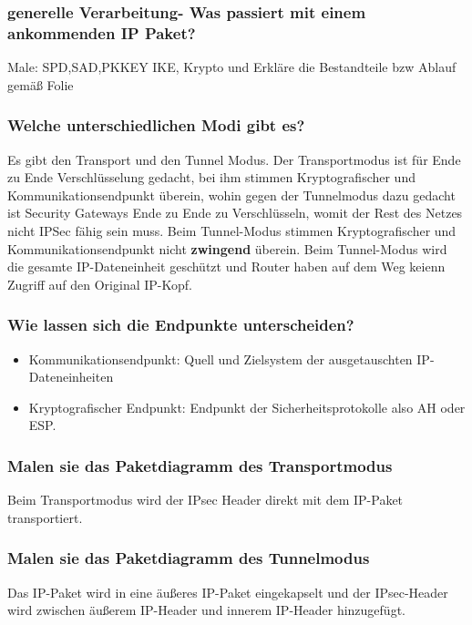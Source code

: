 	\subsubsection{generelle Verarbeitung- Was passiert mit einem ankommenden IP Paket?}
	Male: SPD,SAD,PK\textunderscore KEY IKE, Krypto und Erkläre die Bestandteile bzw Ablauf gemäß Folie %
	
	\subsubsection{Welche unterschiedlichen Modi gibt es?}
	Es gibt den Transport und den Tunnel Modus.
	Der Transportmodus ist für Ende zu Ende Verschlüsselung gedacht, bei ihm stimmen Kryptografischer und Kommunikationsendpunkt überein, wohin gegen der Tunnelmodus dazu gedacht ist Security Gateways Ende zu Ende zu Verschlüsseln, womit der Rest des Netzes nicht IPSec fähig sein muss. Beim Tunnel-Modus stimmen Kryptografischer und Kommunikationsendpunkt nicht \textbf{zwingend} überein. Beim Tunnel-Modus wird die gesamte IP-Dateneinheit geschützt und Router haben auf dem Weg keienn Zugriff auf den Original IP-Kopf.
	
	\subsubsection{Wie lassen sich die Endpunkte unterscheiden?}
	\begin{itemize}
		\item Kommunikationsendpunkt: Quell und Zielsystem der ausgetauschten IP-Dateneinheiten
		\item Kryptografischer Endpunkt: Endpunkt der Sicherheitsprotokolle also AH oder ESP.
	\end{itemize}
			
	\subsubsection{Malen sie das Paketdiagramm des Transportmodus}

	Beim Transportmodus wird der IPsec Header direkt mit  dem IP-Paket transportiert.
	\subsubsection{Malen sie das Paketdiagramm des Tunnelmodus}

	Das IP-Paket wird in eine äußeres IP-Paket eingekapselt und der IPsec-Header wird zwischen äußerem IP-Header und innerem IP-Header hinzugefügt.
